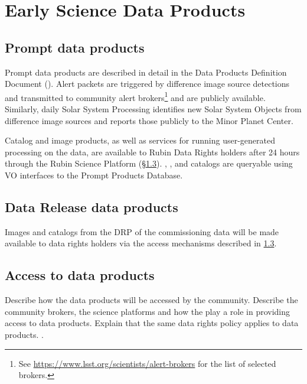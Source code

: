 \section{Early Science Data Products} 
\label{sec:data}

\subsection{Prompt data products}

Prompt data products are described in detail in the Data Products Definition Document (\DPDD).
Alert packets are triggered by difference image source detections and transmitted to community alert brokers\footnote{See \url{https://www.lsst.org/scientists/alert-brokers} for the list of selected brokers.} and are publicly available. 
Similarly, daily Solar System Processing identifies new Solar System Objects from difference image sources and reports those publicly to the Minor Planet Center.

Catalog and image products, as well as services for running user-generated processing on the data, are available to Rubin Data Rights holders after 24 hours through the Rubin Science Platform (\S \ref{ssec:dataaccess}).
\DIASource, \DIAObject, and \SSObject catalogs are queryable using VO interfaces to the Prompt Products Database.


\subsection{Data Release data products}
Images and catalogs from the DRP of the commissioning data will be made available to  data rights holders via the access mechanisms described in \ref{ssec:dataaccess}.

\subsection{Access to \es data products}\label{ssec:dataaccess}
Describe how the \es  data products will be accessed by the community. 
Describe the community brokers, the science platforms and how the \dpvs play a role in providing access to \es data products. 
Explain that the same data rights policy applies to \es data products. \cite{RDO-013}.


